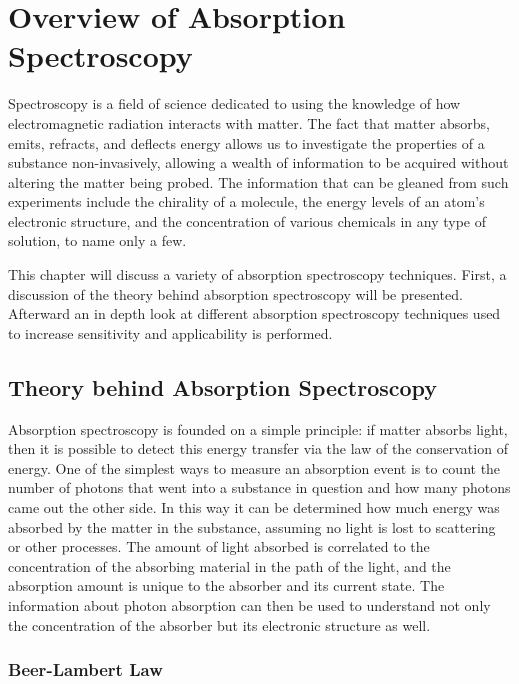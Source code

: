 \chapter{Overview of Absorption Spectroscopy}\label{ch:overview}

Spectroscopy is a field of science dedicated to using the knowledge of how
electromagnetic radiation interacts with matter. The fact that matter absorbs,
emits, refracts, and deflects energy allows us to investigate the properties
of a substance non-invasively, allowing a wealth of information to be acquired
without altering the matter being probed. The information that can be gleaned
from such experiments include the chirality of a molecule, the energy levels
of an atom's electronic structure, and the concentration of various chemicals
in any type of solution, to name only a few.

This chapter will discuss a variety of absorption spectroscopy techniques.
First, a discussion of the theory behind absorption spectroscopy will be
presented. Afterward an in depth look at different absorption spectroscopy
techniques used to increase sensitivity and applicability is performed.



\section{Theory behind Absorption Spectroscopy}\label{sec:abs_theory}

Absorption spectroscopy is founded on a simple principle: if matter absorbs
light, then it is possible to detect this energy transfer via the law of the
conservation of energy. One of the simplest ways to measure an absorption
event is to count the number of photons that went into a substance in question
and how many photons came out the other side. In this way it can be determined
how much energy was absorbed by the matter in the substance, assuming no light
is lost to scattering or other processes. The amount of light absorbed is
correlated to the concentration of the absorbing material in the path of the
light, and the absorption amount is unique to the absorber and its current
state. The information about photon absorption can then be used to understand
not only the concentration of the absorber but its electronic structure as
well.



\subsection{Beer-Lambert Law}\label{subsec:beer}

